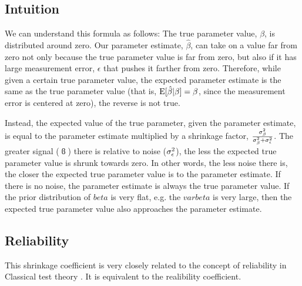 \documentclass[12pt]{article}
\begin{document}
\subsection{Intuition}
We can understand this formula as follows:
The true parameter value, $\beta$, is distributed around zero.
Our parameter estimate, $\hat{\beta}$, can take on a value far from zero not only because the true parameter value is far from zero, but also if it has large measurement error, $\epsilon$ that pushes it farther from zero.
Therefore, while given a certain true parameter value, the expected parameter estimate is the same as the true parameter value (that is, $\mathrm{E}[\hat{\beta} | \beta] = \beta$, since the measurement error is centered at zero), the reverse is not true.

Instead, the expected value of the true parameter, given the parameter estimate, is equal to the parameter estimate multiplied by a shrinkage factor, $\frac{\sigma_{\beta}^2}{\sigma_{\beta}^2 + \sigma_{\epsilon}^2}$.
The greater signal ($\varbeta$) there is relative to noise ($\sigma_{\epsilon}^2$), the less the expected true parameter value is shrunk towards zero.
In other words, the less noise there is, the closer the expected true parameter value is to the parameter estimate.
If there is no noise, the parameter estimate is always the true parameter value.
If the prior distribution of $beta$ is very flat, e.g. the $varbeta$ is very large, then the expected true parameter value also approaches the parameter estimate.

\subsection{Reliability}

This shrinkage coefficient is very closely related to the concept of reliability in Classical test theory \citep{wikipedia2026webReliability}.
It is equivalent to the realibility coefficient.



\end{document}
